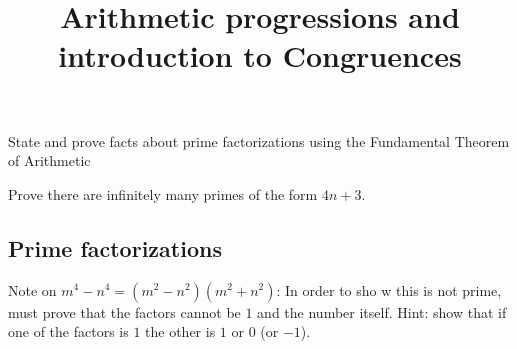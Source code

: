 \documentclass{ximera}
\title{Arithmetic progressions and introduction to Congruences}
\begin{document}
\begin{abstract}
\end{abstract}
\maketitle

\begin{obj}
    \item State and prove facts about prime factorizations using the Fundamental Theorem of Arithmetic
    \item Prove there are infinitely many primes of the form $4n+3$.
\end{obj}

   





\subsection{Prime factorizations}
Note on $m^4-n^4=(m^2-n^2)(m^2+n^2)$: In order to sho w this is not prime, must prove that the factors cannot be $1$ and the number itself. Hint: show that if one of the factors is $1$ the other is $1$ or $0$ (or $-1$).
\end{document}
